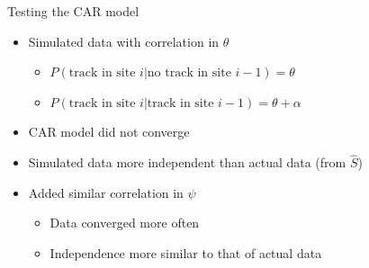 \documentclass{beamer}
\begin{document}
\begin{frame}[label=currentslide]{Testing the CAR model}
	\begin{itemize}
		\item Simulated data with correlation in $\theta$
		\begin{itemize} 
			\item $P(\text{track in site }i|\text{no track in site }i-1)=\theta$
			\item $P(\text{track in site }i|\text{track in site }i-1)=\theta+
			\alpha$
		\end{itemize}
		\item CAR model did not converge
		\item Simulated data more independent than actual data (from $\hat{S}$)
		\item Added similar correlation in $\psi$
		\begin{itemize}
			\item Data converged more often
			\item Independence more similar to that of actual data
		\end{itemize}
	\end{itemize}
\end{frame}
		 
\end{document}
